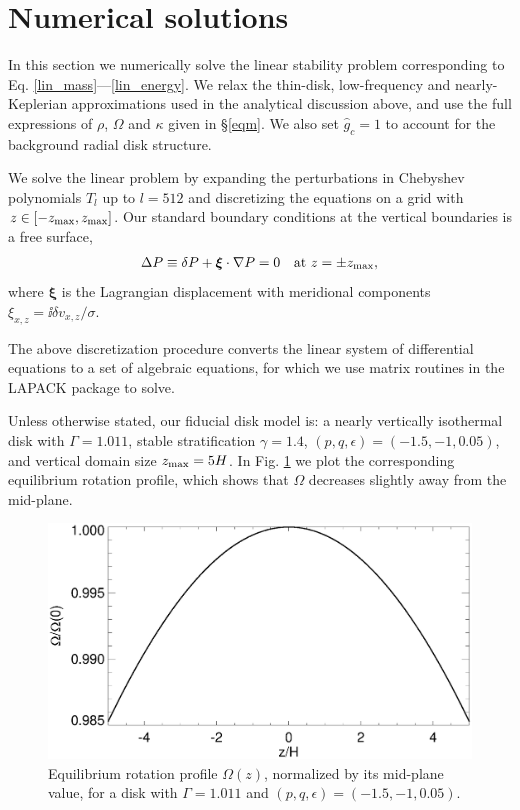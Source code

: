 \section{Numerical solutions}\label{numerical}
In this section we numerically solve the linear stability problem
corresponding to Eq. \ref{lin_mass}---\ref{lin_energy}. 
We relax the thin-disk, low-frequency and nearly-Keplerian
approximations used in the analytical discussion above, and  
use the full expressions of $\rho$, $\Omega$ and
$\kappa$ given in \S\ref{eqm}. We also set $\hat{g}_c=1$ to
account for the background radial disk structure.  



We solve the linear problem by expanding the
perturbations in Chebyshev polynomials $T_l$ up to $l=512$
and discretizing the equations on a grid with
$z\in[-z_\mathrm{max},z_\mathrm{max}]$. Our standard boundary conditions at the vertical
boundaries is a free surface, 
\begin{align}
  \Delta P \equiv \delta P + \bm{\xi}\cdot\nabla P= 0 \quad \text{at } z=\pm z_\mathrm{max},
\end{align}
where $\bm{\xi}$ is the Lagrangian displacement with meridional 
components $\xi_{x,z} = \ii\delta v_{x,z}/\sigma$. 

The above discretization procedure
converts the linear system of differential equations to a set of 
algebraic equations, for which we use matrix routines in the LAPACK
package to solve. 


Unless otherwise stated, our fiducial disk model is: a nearly 
vertically isothermal disk with $\Gamma=1.011$, stable
stratification $\gamma=1.4$, $(p,q,\epsilon)=(-1.5,-1,0.05)$, and 
vertical domain size $z_\mathrm{max}=5H$. In Fig. \ref{omega_z} we plot the
corresponding equilibrium rotation profile, which shows that $\Omega$
decreases slightly away from the mid-plane.  

\begin{figure}
  \includegraphics[width=\linewidth,clip=true,trim=0cm 0cm 0cm
  0cm]{figures/omega2} 
  \caption{Equilibrium rotation profile $\Omega(z)$,
    normalized by its mid-plane value, for a disk with $\Gamma=1.011$
    and $(p,q,\epsilon)=(-1.5,-1,0.05)$. 
    \label{omega_z} 
  }
\end{figure}

